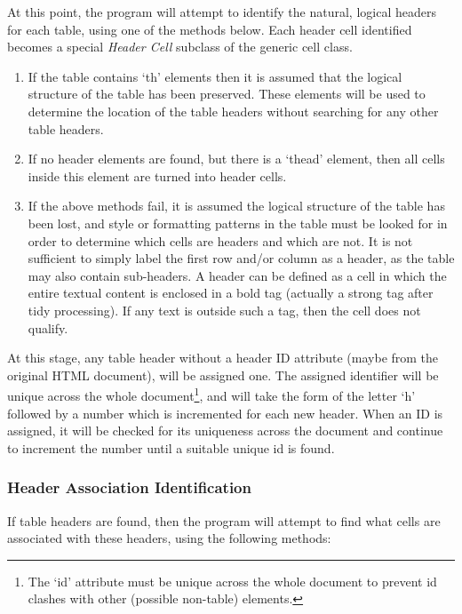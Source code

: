 At this point, the program will attempt to identify the natural, logical
headers for each table, using one of the methods below. Each header cell
identified becomes a special \emph{Header Cell} subclass of the generic cell
class.

\begin{enumerate}

\item If the table contains `th' elements then it is assumed that the logical
structure of the table has been preserved. These elements will be used to
determine the location of the table headers without searching for any other
table headers.

\item If no header elements are found, but there is a `thead' element, then 
all cells inside this element are turned into header cells.

\item If the above methods fail, it is assumed the logical structure of the
table has been lost, and style or formatting patterns in the table must be
looked for in order to determine which cells are headers and which are not. It
is not sufficient to simply label the first row and/or column as a header, as
the table may also contain sub-headers. A header can be defined as a cell in
which the entire textual content is enclosed in a bold tag (actually a strong
tag after tidy processing). If any text is outside such a tag, then the cell
does not qualify.

\end{enumerate}

At this stage, any table header without a header ID attribute (maybe from the
original HTML document), will be assigned one. The assigned identifier will be
unique across the whole document\footnote{The `id' attribute must be unique
across the whole document to prevent id clashes with other (possible non-table)
elements.}, and will take the form of the letter `h' followed by a number which
is incremented for each new header. When an ID is assigned, it will be checked for
its uniqueness across the document and continue to increment the number until a
suitable unique id is found.

\subsubsection{Header Association Identification}

If table headers are found, then the program will attempt to find what cells
are associated with these headers, using the following methods:

